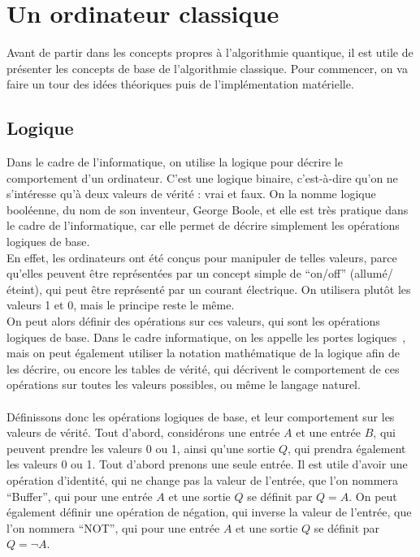 \chapter{Un ordinateur classique}\label{ch:un-ordinateur-classique}

Avant de partir dans les concepts propres à l'algorithmie quantique, il est utile de présenter les concepts
de base de l'algorithmie classique.
Pour commencer, on va faire un tour des idées théoriques puis de l'implémentation matérielle.

\section{Logique}\label{sec:logique}

Dans le cadre de l'informatique, on utilise la logique pour décrire le comportement d'un ordinateur.
C'est une logique binaire, c'est-à-dire qu'on ne s'intéresse qu'à deux valeurs de vérité : vrai et faux.
On la nomme logique booléenne, du nom de son inventeur, George Boole, et elle est très pratique dans le cadre
de l'informatique, car elle permet de décrire simplement les opérations logiques de base.\\
En effet, les ordinateurs ont été conçus pour manipuler de telles valeurs, parce qu'elles peuvent être représentées
par un concept simple de ``on/off'' (allumé/éteint), qui peut être représenté par un courant électrique.
On utilisera plutôt les valeurs 1 et 0, mais le principe reste le même.\\
On peut alors définir des opérations sur ces valeurs, qui sont les opérations logiques de base.
Dans le cadre informatique, on les appelle les portes logiques~\cite{wiki:logic-gate}, mais on peut également utiliser la notation
mathématique de la logique afin de les décrire, ou encore les tables de vérité, qui décrivent le comportement
de ces opérations sur toutes les valeurs possibles, ou même le langage naturel.\\ \\
Définissons donc les opérations logiques de base, et leur comportement sur les valeurs de vérité.
Tout d'abord, considérons une entrée $A$ et une entrée $B$, qui peuvent prendre les valeurs 0 ou 1, ainsi qu'une
sortie $Q$, qui prendra également les valeurs 0 ou 1.
Tout d'abord prenons une seule entrée.
Il est utile d'avoir une opération d'identité, qui ne change pas la valeur de l'entrée, que l'on nommera
``Buffer'', qui pour une entrée $A$ et une sortie $Q$ se définit par $Q = A$.
On peut également définir une opération de négation, qui inverse la valeur de l'entrée, que l'on nommera
``NOT'', qui pour une entrée $A$ et une sortie $Q$ se définit par $Q = \neg A$.

